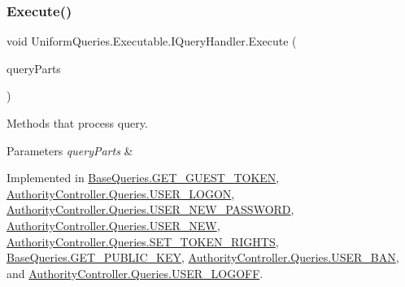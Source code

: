 \mbox{\label{interface_uniform_queries_1_1_executable_1_1_i_query_handler_a3268d72c0388f5e3debba4d73bdfe523}} 
\subsubsection{\texorpdfstring{Execute()}{Execute()}}
{\footnotesize\ttfamily void Uniform\+Queries.\+Executable.\+I\+Query\+Handler.\+Execute (\begin{DoxyParamCaption}\item[{\mbox{\hyperlink{struct_uniform_queries_1_1_query_part}{Query\+Part}} \mbox{[}$\,$\mbox{]}}]{query\+Parts }\end{DoxyParamCaption})}



Methods that process query. 


\begin{DoxyParams}{Parameters}
{\em query\+Parts} & \\
\hline
\end{DoxyParams}


Implemented in \mbox{\hyperlink{class_base_queries_1_1_g_e_t___g_u_e_s_t___t_o_k_e_n_afbad0ace27a743793bccea51a5c39db5}{Base\+Queries.\+G\+E\+T\+\_\+\+G\+U\+E\+S\+T\+\_\+\+T\+O\+K\+EN}}, \mbox{\hyperlink{class_authority_controller_1_1_queries_1_1_u_s_e_r___l_o_g_o_n_a001f81c71597259636be777078e50f7e}{Authority\+Controller.\+Queries.\+U\+S\+E\+R\+\_\+\+L\+O\+G\+ON}}, \mbox{\hyperlink{class_authority_controller_1_1_queries_1_1_u_s_e_r___n_e_w___p_a_s_s_w_o_r_d_a567cb1f67a718cab9dae99a9d4e892d4}{Authority\+Controller.\+Queries.\+U\+S\+E\+R\+\_\+\+N\+E\+W\+\_\+\+P\+A\+S\+S\+W\+O\+RD}}, \mbox{\hyperlink{class_authority_controller_1_1_queries_1_1_u_s_e_r___n_e_w_a05ffc1bd68a9d937aee817c05f273005}{Authority\+Controller.\+Queries.\+U\+S\+E\+R\+\_\+\+N\+EW}}, \mbox{\hyperlink{class_authority_controller_1_1_queries_1_1_s_e_t___t_o_k_e_n___r_i_g_h_t_s_aebb323c8033e3a027f59c55a95695360}{Authority\+Controller.\+Queries.\+S\+E\+T\+\_\+\+T\+O\+K\+E\+N\+\_\+\+R\+I\+G\+H\+TS}}, \mbox{\hyperlink{class_base_queries_1_1_g_e_t___p_u_b_l_i_c___k_e_y_a6351a2ced538508e861a1829864d1d0d}{Base\+Queries.\+G\+E\+T\+\_\+\+P\+U\+B\+L\+I\+C\+\_\+\+K\+EY}}, \mbox{\hyperlink{class_authority_controller_1_1_queries_1_1_u_s_e_r___b_a_n_a160a12bc99edf855a2bdddb908596ecf}{Authority\+Controller.\+Queries.\+U\+S\+E\+R\+\_\+\+B\+AN}}, and \mbox{\hyperlink{class_authority_controller_1_1_queries_1_1_u_s_e_r___l_o_g_o_f_f_a2e4d5a0f8ee93210522c41a38adbcce2}{Authority\+Controller.\+Queries.\+U\+S\+E\+R\+\_\+\+L\+O\+G\+O\+FF}}.

